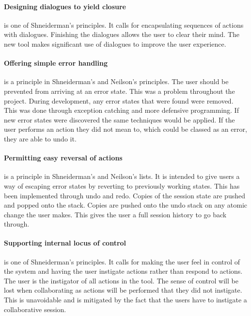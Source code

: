 \paragraph*{Designing dialogues to yield closure} is one of Shneiderman's principles.  It calls for encapsulating sequences of actions with dialogues.  Finishing the dialogues allows the user to clear their mind.  The new tool makes significant use of dialogues to improve the user experience.

\paragraph*{Offering simple error handling} is a principle in Shneiderman's and Neilson's principles.  The user should be prevented from arriving at an error state.  This was a problem throughout the project.  During development, any error states that were found were removed. This was done through exception catching and more defensive programming.  If new error states were discovered the same techniques would be applied.  If the user performs an action they did not mean to, which could be classed as an error, they are able to undo it.

\paragraph*{Permitting easy reversal of actions} is a principle in Shneiderman's and Neilson's lists.  It is intended to give users a way of escaping error states by reverting to previously working states.  This has been implemented through undo and redo.  Copies of the session state are pushed and popped onto the stack.  Copies are pushed onto the undo stack on any atomic change the user makes.  This gives the user a full session history to go back through.

\paragraph*{Supporting internal locus of control} is one of Shneiderman's principles.  It calls for making the user feel in control of the system and having the user instigate actions rather than respond to actions.  The user is the instigator of all actions in the tool.  The sense of control will be lost when collaborating as actions will be performed that they did not instigate.  This is unavoidable and is mitigated by the fact that the users have to instigate a collaborative session.


